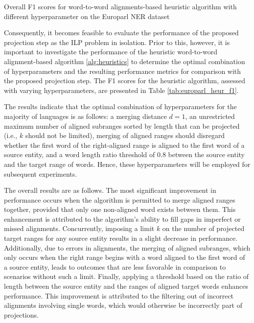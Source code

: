 \begin{table}[ht]
  \centering
  
  \caption{Overall F1 scores for word-to-word alignments-based heuristic
  algorithm with different hyperparameter  on the Europarl NER dataset}
  \label{tab:europarl_heur_f1}
\end{table}

Consequently, it becomes feasible to evaluate the performance of the proposed
projection step as the ILP problem in isolation. Prior to this, however, it is
important to investigate the performance of the heuristic word-to-word alignment-based
algorithm \ref{alg:heuristics} to determine the optimal combination of hyperparameters
and the resulting performance metrics for comparison with the proposed projection step.
The F1 scores for the heuristic algorithm, assessed with varying hyperparameters, are
presented in Table \ref{tab:europarl_heur_f1}.

The results indicate that the optimal combination of hyperparameters for the majority of
languages is as follows: a merging distance \( d = 1 \), an unrestricted maximum number
of aligned subranges sorted by length that can be projected (i.e., \( k \) should not be
limited), merging of aligned ranges should disregard whether the first word of the
right-aligned range is aligned to the first word of a source entity, and a word length
ratio threshold of \( 0.8 \)  between the source entity and the target range of words.
Hence, these hyperparameters will be employed for subsequent experiments.

The overall results are as follows. The most significant improvement in performance
occurs when the algorithm is permitted to merge aligned ranges together, provided
that only one non-aligned word exists between them. This enhancement is attributed to
the algorithm's ability to fill gaps in imperfect or missed alignments. Concurrently,
imposing a limit \( k \) on the number of projected target ranges for any source entity
results in a slight decrease in performance. Additionally, due to errors in alignments,
the merging of aligned subranges, which only occurs when the right range begins with a
word aligned to the first word of a source entity, leads to outcomes that are less
favorable in comparison to scenarios without such a limit. Finally, applying a threshold
based on the ratio of length between the source entity and the ranges of aligned target
words enhances performance. This improvement is attributed to the filtering out of
incorrect alignments involving single words, which would otherwise be incorrectly part of projections.

